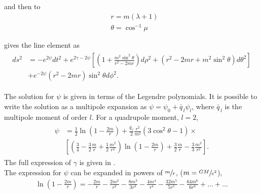 and then to
\begin{subequations}
\begin{align*}
	&r = m(\lambda + 1)\\
	&\theta = \cos^{-1}\mu
\end{align*}
\end{subequations}

gives the line element as
\begin{align}
\begin{split}
	ds^2 &= -e^{2\psi}dt^2 +  e^{2\gamma -2\psi} \left[\left(1+\frac{m^2\sin^2\theta}{r^2-2mr}\right)d\rho^2 + (r^2-2mr + m^2\sin^2\theta)d\theta^2\right]  \\
&+  e^{-2\psi}(r^2 - 2mr)\sin^2\theta d\phi^2.
\end{split}
\end{align}

The solution for $\psi$ is given in terms of the Legendre polynomials.
It is possible to write the solution as a multipole expansion as $\psi = \psi_0 + \bar{q}_{\, l}\psi_l$, where $\bar{q}_{\, l}$ is the multipole moment of order $l$. For a quadrupole moment, $l = 2$, 
\begin{align}
\begin{split}
	\psi &= \frac{1}{2}\ln\left(1-\frac{2m}{r}\right) + \frac{\bar{q}_{\, l}}{2} \frac{r^2}{m^2} (3\cos^2\theta - 1) \times\\
	& \left[\left(\frac{3}{4} - \frac{3}{2}\frac{m}{r} + \frac{1}{2}\frac{m^2}{r^2}\right)\ln\left(1-\frac{2m}{r}\right) + \frac{3}{2}\frac{m}{r} - \frac{3}{3}\frac{m^2}{r^2}\right].
\end{split}
\end{align}
The full expression of $\gamma$ is given in \cite{Brumberg, johnandcoulter}.\\

The expression for $\psi$ can be expanded in powers of $\sfrac{m}{r}$, ($m  = \sfrac{GM}{c^2}$),\\
\begin{align}
	\ln\left(1-\frac{2m}{r}\right) = -\frac{2m}{r}-\frac{2m^2}{r^2}  -\frac{8m^3}{3r^3} -\frac{4m^4}{r^4}-\frac{32m^5}{5r^5} -\frac{64m^6}{6r^6} + ... + ...
\end{align}

